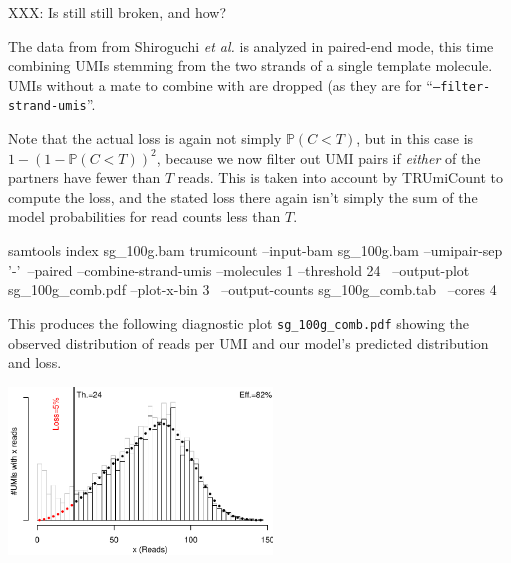 \documentclass[10pt]{article}
\begin{document}
XXX: Is still still broken, and how?

The data from from Shiroguchi \textit{et al.} is analyzed in paired-end mode, this time combining UMIs stemming from the two strands of a single template molecule. UMIs without a mate to combine with are dropped (as they are for ``\texttt{--filter-strand-umis}''.

Note that the actual loss is again not simply $\mathbb{P}(C < T)$, but in this case is $1 - (1-\mathbb{P}(C < T))^2$, because we now filter out UMI pairs if \emph{either} of the partners have fewer than $T$ reads. This is taken into account by TRUmiCount to compute the loss, and the stated loss there again isn't simply the sum of the model probabilities for read counts less than $T$. 

\begin{shellcode}
samtools index sg_100g.bam
trumicount --input-bam sg_100g.bam --umipair-sep '-'\
  --paired --combine-strand-umis --molecules 1 --threshold 24 \
  --output-plot sg_100g_comb.pdf --plot-x-bin 3 \
  --output-counts sg_100g_comb.tab \
  --cores 4
\end{shellcode}

This produces the following diagnostic plot \texttt{sg\_100g\_comb.pdf} showing the observed distribution of reads per UMI and our model's predicted distribution and loss.

{\centering \includegraphics[width=7cm]{../examples/sg_100g_comb.pdf}\\}
\end{document}
